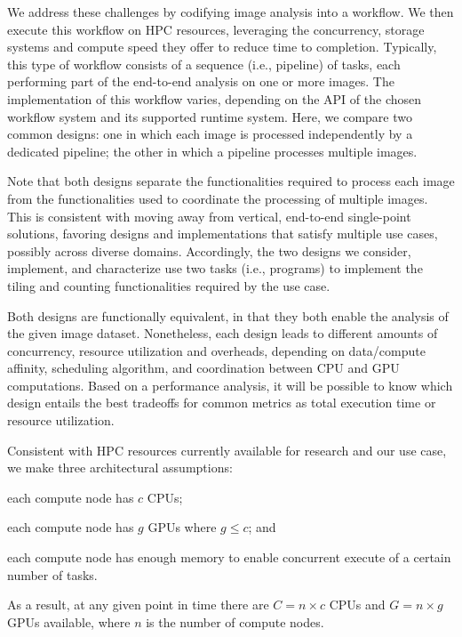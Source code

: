 We address these challenges by codifying image analysis into a workflow.
We then execute this workflow on HPC resources, leveraging the concurrency, storage systems and compute speed they offer to reduce time to completion.
Typically, this type of workflow consists of a sequence (i.e., pipeline) of tasks, each performing part of the end-to-end analysis on one or more images.
The implementation of this workflow varies, depending on the API of the chosen workflow system and its supported runtime system.
Here, we compare two common designs: one in which each image is processed independently by a dedicated pipeline; the other in which a pipeline processes multiple images.

Note that both designs separate the functionalities required to process each image from the functionalities used to coordinate the processing of multiple images.
This is consistent with moving away from vertical, end-to-end single-point solutions, favoring designs and implementations that satisfy multiple use cases, possibly across diverse domains.
Accordingly, the two designs we consider, implement, and characterize use two tasks (i.e., programs) to implement the tiling and counting functionalities required by the use case.

Both designs are functionally equivalent, in that they both enable the analysis of the given image dataset.
Nonetheless, each design leads to different amounts of concurrency, resource utilization and overheads, depending on data/compute affinity, scheduling algorithm, and coordination between CPU and GPU computations.
Based on a performance analysis, it will be possible to know which design entails the best tradeoffs for common metrics as total execution time or resource utilization.

Consistent with HPC resources currently available for research and our use case, we make three architectural assumptions: 
\begin{inparaenum}[(1)]
    \item each compute node has $c$ CPUs;
    \item each compute node has $g$ GPUs where $g \le c$; and
    \item each compute node has enough memory to enable concurrent execute of a certain number of tasks.
\end{inparaenum}
As a result, at any given point in time there are $C = n\times c$ CPUs and $G = n\times g$ GPUs available, where $n$ is the number of compute nodes.

